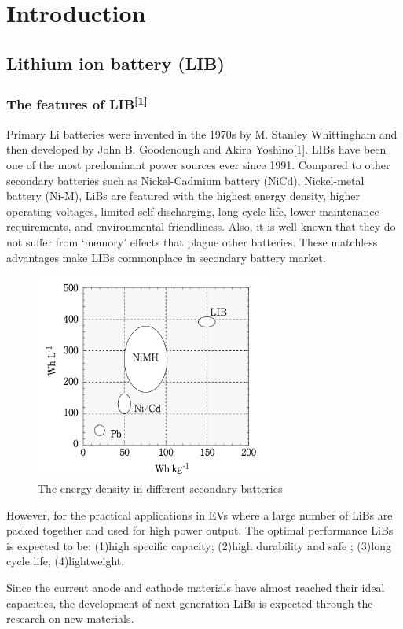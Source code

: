 \chapter{Introduction}
\section{Lithium ion battery (LIB)}
\subsection{The features of LIB\textsuperscript{[1]}}
Primary Li batteries were invented in the 1970s by M. Stanley Whittingham and then developed by John B. Goodenough and Akira Yoshino[1]. LIBs have been one of the most predominant power sources ever since 1991. Compared to other secondary batteries such as Nickel-Cadmium battery (NiCd), Nickel-metal battery (Ni-M), LiBs are featured with the highest energy density, higher operating voltages, limited self-discharging, long cycle life, lower maintenance requirements, and environmental friendliness. Also, it is well known that they do not suffer from ‘memory’ effects that plague other batteries. These matchless advantages make LIBs commonplace in secondary battery market. 
\begin{figure}[h]
\centering
\includegraphics[width=8cm]{src/fig/fig1.png}
\caption{The energy density in different secondary batteries}
\end{figure}
However, for the practical applications in EVs where a large number of LiBs are packed together and used for high power output. The optimal performance LiBs is expected to be: (1)high specific capacity; (2)high durability and safe ; (3)long cycle life; (4)lightweight.

Since the current anode and cathode materials have almost reached their ideal capacities, the development of next-generation LiBs is expected through the research on new materials.

